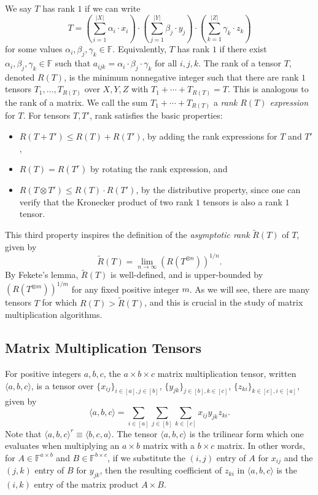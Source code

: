 \documentclass{theoretics}
\newcommand{\F}{\mathbb{F}}
\begin{document}
We say $T$ has rank $1$ if we can write $$T = \left( \sum_{i=1}^{|X|} \alpha_i \cdot x_i \right) \cdot \left( \sum_{j=1}^{|Y|} \beta_j \cdot y_j \right) \cdot \left( \sum_{k=1}^{|Z|} \gamma_k \cdot z_k \right)$$ for some values $\alpha_i, \beta_j, \gamma_k \in \F$. Equivalently, $T$ has rank $1$ if there exist $\alpha_i, \beta_j, \gamma_k \in \F$  such that $a_{ijk} = \alpha_i \cdot \beta_j \cdot \gamma_k$ for all $i,j,k$. The rank of a tensor $T$, denoted $R(T)$, is the minimum nonnegative integer such that there are rank $1$ tensors $T_1, \ldots, T_{R(T)}$ over $X,Y,Z$ with $T_1 + \cdots + T_{R(T)} = T$. This is analogous to the rank of a matrix. We call the sum $T_1 + \cdots + T_{R(T)}$ a \emph{rank $R(T)$ expression} for $T$. For tensors $T,T'$, rank satisfies the basic properties:
\begin{itemize}
    \item $R(T+T') \leq R(T) + R(T')$, by adding the rank expressions for $T$ and $T'$,
    \item $R(T)=R(T^r)$ by rotating the rank expression, and
    \item $R(T \otimes T') \leq R(T) \cdot R(T')$, by the distributive property, since one can verify that the Kronecker product of two rank $1$ tensors is also a rank $1$ tensor. 
\end{itemize}
This third property inspires the definition of the \emph{asymptotic rank} $\tilde{R}(T)$ of $T$, given by $$\tilde{R}(T) = \lim_{n \to \infty} (R(T^{\otimes n}))^{1/n}.$$ By Fekete's lemma, $\tilde{R}(T)$ is well-defined, and is upper-bounded by $(R(T^{\otimes m}))^{1/m}$ for any fixed positive integer $m$. As we will see, there are many tensors $T$ for which $R(T) > \tilde{R}(T)$, and this is crucial in the study of matrix multiplication algorithms.

\subsection{Matrix Multiplication Tensors}

For positive integers $a,b,c$, the $a \times b \times c$ matrix multiplication tensor, written $\langle a,b,c \rangle$, is a tensor over $\{x_{ij}\}_{i \in [a], j \in [b]}$, $\{y_{jk}\}_{j \in [b], k \in [c]}$, $\{z_{ki}\}_{k \in [c], i \in [a]}$, given by $$\langle a,b,c \rangle = \sum_{i \in [a]} \sum_{j \in [b]} \sum_{k \in [c]} x_{ij} y_{jk} z_{ki}.$$
Note that $\langle a,b,c \rangle^r \equiv \langle b,c,a \rangle$. The tensor $\langle a,b,c \rangle$ is the trilinear form which one evaluates when multiplying an $a \times b$ matrix with a $b \times c$ matrix. In other words, for $A \in \F^{a \times b}$ and $B \in \F^{b \times c}$, if we substitute the $(i,j)$ entry of $A$ for $x_{ij}$ and the $(j,k)$ entry of $B$ for $y_{jk}$, then the resulting coefficient of $z_{ki}$ in $\langle a,b,c \rangle$ is the $(i,k)$ entry of the matrix product $A \times B$.
\end{document}
